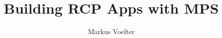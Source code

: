 \documentclass{llncs}
\title{Building RCP Apps with MPS}
\author{Markus Voelter}
\institute{independent/itemis}
\begin{document}
\maketitle


\begin{abstract}
\end{abstract} 




% 
%
\end{document}
